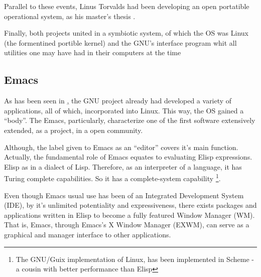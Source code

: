 \documentclass[
12pt,				%
openright,			%
oneside,			%
a4paper,			%
brazil,				%
english,			%
]{abntex2}
\begin{document}
Parallel to these events, Linus Torvalds had been developing an open portatible
operational system, as his master's thesis
\cite{torvalds1997linux}.

Finally, both projects united in a symbiotic system, of which the OS
was Linux (the formentined portible kernel) and the GNU's interface
program whit all utilities one may have had in their computers at the
time \cite{stallman1997}  

\subsection{Emacs}

As has been seen in \href{sec:linux-origin}, the GNU project already
had developed a variety of applications, all of which, incorporated
into Linux. This way, the OS gained a ``body''. The Emacs,
particularly, characterize one of the first software extensively
extended, as a project, in a open community.

Although, the label given to Emacs as an ``editor'' covers it's main
function. Actually, the fundamental role of Emacs equates to
evaluating Elisp expressions. Elisp as in a dialect of
Lisp. Therefore, as an interpreter of a language, it has Turing
complete capabilities. So it has a complete-system capability
\footnote{The GNU/Guix implementation of Linux, has been implemented
  in Scheme - a cousin with better performance than Elisp}.      

Even though Emacs usual use has been of an Integrated Development
System (IDE), by it's unlimited potentiality and expressiveness, there
exists packages and applications written in Elisp to become a fully
featured Window Manager (WM). That is, Emacs, through Emacs's X Window
Manager (EXWM), can serve as a graphical and manager interface to
other applications. 
\end{document}
